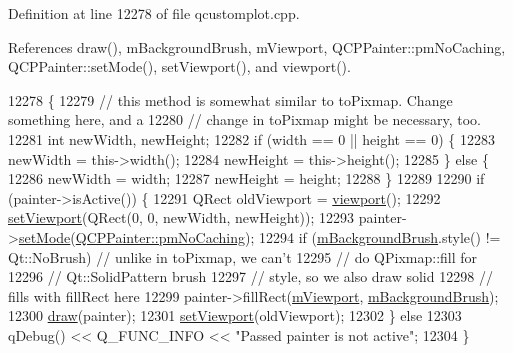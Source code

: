 Definition at line 12278 of file qcustomplot.\+cpp.



References draw(), m\+Background\+Brush, m\+Viewport, Q\+C\+P\+Painter\+::pm\+No\+Caching, Q\+C\+P\+Painter\+::set\+Mode(), set\+Viewport(), and viewport().


\begin{DoxyCode}
12278                                                                       \{
12279   \textcolor{comment}{// this method is somewhat similar to toPixmap. Change something here, and a}
12280   \textcolor{comment}{// change in toPixmap might be necessary, too.}
12281   \textcolor{keywordtype}{int} newWidth, newHeight;
12282   \textcolor{keywordflow}{if} (width == 0 || height == 0) \{
12283     newWidth = this->width();
12284     newHeight = this->height();
12285   \} \textcolor{keywordflow}{else} \{
12286     newWidth = width;
12287     newHeight = height;
12288   \}
12289 
12290   \textcolor{keywordflow}{if} (painter->isActive()) \{
12291     QRect oldViewport = \hyperlink{class_q_custom_plot_a953ecdbc28018e7e84cb6213ad3d88c2}{viewport}();
12292     \hyperlink{class_q_custom_plot_a3f9bc4b939dd8aaba9339fd09f273fc4}{setViewport}(QRect(0, 0, newWidth, newHeight));
12293     painter->\hyperlink{class_q_c_p_painter_af6b1f7d2bbc548b10aa55d8b6ad49577}{setMode}(\hyperlink{class_q_c_p_painter_a156cf16444ff5e0d81a73c615fdb156dae78f9a4eb277a5f9207f50850a51a0b0}{QCPPainter::pmNoCaching});
12294     \textcolor{keywordflow}{if} (\hyperlink{class_q_custom_plot_a3aef5de4ac012178e3293248e9c63737}{mBackgroundBrush}.style() != Qt::NoBrush) \textcolor{comment}{// unlike in toPixmap, we can't}
12295                                                  \textcolor{comment}{// do QPixmap::fill for}
12296                                                  \textcolor{comment}{// Qt::SolidPattern brush}
12297                                                  \textcolor{comment}{// style, so we also draw solid}
12298                                                  \textcolor{comment}{// fills with fillRect here}
12299       painter->fillRect(\hyperlink{class_q_custom_plot_ac0a7c38a715526c257cff95774f83ab6}{mViewport}, \hyperlink{class_q_custom_plot_a3aef5de4ac012178e3293248e9c63737}{mBackgroundBrush});
12300     \hyperlink{class_q_custom_plot_ad7a7d878bf050f101a43008e7d8fdb52}{draw}(painter);
12301     \hyperlink{class_q_custom_plot_a3f9bc4b939dd8aaba9339fd09f273fc4}{setViewport}(oldViewport);
12302   \} \textcolor{keywordflow}{else}
12303     qDebug() << Q\_FUNC\_INFO << \textcolor{stringliteral}{"Passed painter is not active"};
12304 \}
\end{DoxyCode}


